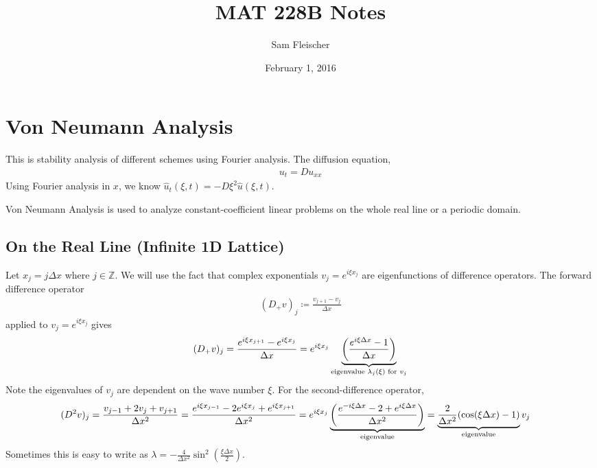 \documentclass{article}
\title{MAT 228B Notes}
\author{Sam Fleischer}
\date{February 1, 2016}
\newcommand{\Dx}{\Delta x}
\begin{document}
    \maketitle

    \section{Von Neumann Analysis}

        This is stability analysis of different schemes using Fourier analysis.  The diffusion equation,
        \begin{align*}
            u_t = Du_{xx}
        \end{align*}
        Using Fourier analysis in $x$, we know $\hat{u}_t(\xi,t) = -D\xi^2\hat{u}(\xi,t)$.

        Von Neumann Analysis is used to analyze constant-coefficient linear problems on the whole real line or a periodic domain.

        \subsection{On the Real Line (Infinite 1D Lattice)}

            Let $x_j = j\Dx$ where $j \in \mathbb{Z}$.  We will use the fact that complex exponentials $v_j = e^{i\xi x_j}$ are eigenfunctions of difference operators.  The forward difference operator
            \begin{align*}
                (D_+v)_j \coloneqq \frac{v_{j+1} - v_j}{\Dx}
            \end{align*}
            applied to $v_j = e^{i\xi x_j}$ gives
            \begin{align*}
                (D_+v)_j = \frac{e^{i\xi x_{j+1}} - e^{i\xi x_j}}{\Dx} = e^{i\xi x_j}\underbrace{\qty(\frac{e^{i\xi\Dx} - 1}{\Dx})}_\text{eigenvalue $\lambda_j(\xi)$ for $v_j$}
            \end{align*}
            Note the eigenvalues of $v_j$ are dependent on the wave number $\xi$.
            For the second-difference operator,
            \begin{align*}
                (D^2v)_j = \frac{v_{j-1} + 2v_j + v_{j+1}}{\Dx^2} = \frac{e^{i\xi x_{j-1}} - 2e^{i\xi x_j} + e^{i\xi x_{j+1}}}{\Dx^2} &= e^{i\xi x_j}\underbrace{\qty(\frac{e^{-i\xi\Dx} - 2 + e^{i\xi\Dx}}{\Dx^2})}_\text{eigenvalue} = \underbrace{\frac{2}{\Dx^2}(\cos(\xi\Dx) - 1)}_\text{eigenvalue}v_j
            \end{align*}
            Sometimes this is easy to write as $\lambda = -\frac{4}{\Dx^2}\sin^2(\frac{\xi\Dx}{2})$.
\end{document}
